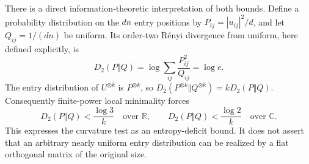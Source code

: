 There is a direct information-theoretic interpretation of both bounds.
Define a probability distribution on the $dn$ entry positions by
$P_{ij}=|u_{ij}|^2/d$, and let $Q_{ij}=1/(dn)$ be uniform. Its
order-two R\'enyi divergence from uniform, here defined explicitly, is
\[
 D_2(P\Vert Q)=\log\sum_{ij}\frac{P_{ij}^2}{Q_{ij}}
             =\log e.
\]
The entry distribution of $U^{\otimes k}$ is $P^{\otimes k}$, so
$D_2(P^{\otimes k}\Vert Q^{\otimes k})=kD_2(P\Vert Q)$.
Consequently finite-power local minimality forces
\[
 D_2(P\Vert Q)<\frac{\log3}{k}\quad\text{over }\mathbb R,
 \qquad
 D_2(P\Vert Q)<\frac{\log2}{k}\quad\text{over }\mathbb C.
\]
This expresses the curvature test as an entropy-deficit bound. It
does not assert that an arbitrary nearly uniform entry distribution
can be realized by a flat orthogonal matrix of the original size.
